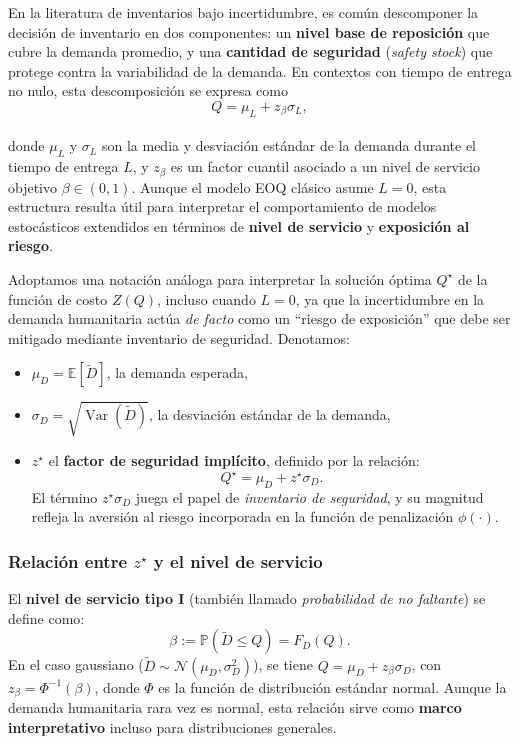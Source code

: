 \documentclass[
  spanish,
  us-letterpaper,
  DIV=11,
  numbers=noendperiod]{scrreprt}
\providecommand{\tightlist}{%
  \setlength{\itemsep}{0pt}\setlength{\parskip}{0pt}}
\numberwithin{equation}{section}
\begin{document}
En la literatura de inventarios bajo incertidumbre, es común descomponer
la decisión de inventario en dos componentes: un \textbf{nivel base de
reposición} que cubre la demanda promedio, y una \textbf{cantidad de
seguridad} (\emph{safety stock}) que protege contra la variabilidad de
la demanda. En contextos con tiempo de entrega no nulo, esta
descomposición se expresa como\\
\[
Q = \mu_L + z_\beta \sigma_L,
\]\\
donde \(\mu_L\) y \(\sigma_L\) son la media y desviación estándar de la
demanda durante el tiempo de entrega \(L\), y \(z_\beta\) es un factor
cuantil asociado a un nivel de servicio objetivo \(\beta \in (0,1)\).
Aunque el modelo EOQ clásico asume \(L = 0\), esta estructura resulta
útil para interpretar el comportamiento de modelos estocásticos
extendidos en términos de \textbf{nivel de servicio} y
\textbf{exposición al riesgo}.

Adoptamos una notación análoga para interpretar la solución óptima
\(Q^\star\) de la función de costo \(Z(Q)\), incluso cuando \(L = 0\),
ya que la incertidumbre en la demanda humanitaria actúa \emph{de facto}
como un ``riesgo de exposición'' que debe ser mitigado mediante
inventario de seguridad. Denotamos:

\begin{itemize}
\tightlist
\item
  \(\mu_D = \mathbb{E}[\tilde{D}]\), la demanda esperada,
\item
  \(\sigma_D = \sqrt{\operatorname{Var}(\tilde{D})}\), la desviación
  estándar de la demanda,
\item
  \(z^\star\) el \textbf{factor de seguridad implícito}, definido por la
  relación: \[
  Q^\star = \mu_D + z^\star \sigma_D.
  \] El término \(z^\star \sigma_D\) juega el papel de \emph{inventario
  de seguridad}, y su magnitud refleja la aversión al riesgo incorporada
  en la función de penalización \(\phi(\cdot)\).
\end{itemize}

\subsubsection{\texorpdfstring{Relación entre \(z^\star\) y el nivel de
servicio}{Relación entre z\^{}\textbackslash star y el nivel de servicio}}\label{relaciuxf3n-entre-zstar-y-el-nivel-de-servicio}

El \textbf{nivel de servicio tipo I} (también llamado \emph{probabilidad
de no faltante}) se define como: \[
\beta := \mathbb{P}(\tilde{D} \leq Q) = F_D(Q).
\] En el caso gaussiano
(\(\tilde{D} \sim \mathcal{N}(\mu_D, \sigma_D^2)\)), se tiene
\(Q = \mu_D + z_\beta \sigma_D\), con \(z_\beta = \Phi^{-1}(\beta)\),
donde \(\Phi\) es la función de distribución estándar normal. Aunque la
demanda humanitaria rara vez es normal, esta relación sirve como
\textbf{marco interpretativo} incluso para distribuciones generales.
\end{document}
